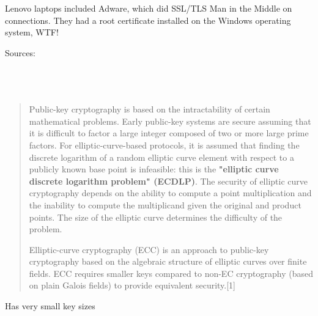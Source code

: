 \documentclass[Screen16to9,17pt]{foils}
\begin{document}


Lenovo laptops included Adware, which did SSL/TLS Man in the Middle on connections.
They had a root certificate installed on the Windows operating system, WTF!

{\footnotesize Sources:\\
\\
\\
\\
}{\tiny{}
}




\begin{quote}
  Public-key cryptography is based on the intractability of certain mathematical problems. Early public-key systems are secure assuming that it is difficult to factor a large integer composed of two or more large prime factors. For elliptic-curve-based protocols, it is assumed that finding the discrete logarithm of a random elliptic curve element with respect to a publicly known base point is infeasible: this is the {\bf "elliptic curve discrete logarithm problem" (ECDLP)}. The security of elliptic curve cryptography depends on the ability to compute a point multiplication and the inability to compute the multiplicand given the original and product points. The size of the elliptic curve determines the difficulty of the problem.

Elliptic-curve cryptography (ECC) is an approach to public-key cryptography based on the algebraic structure of elliptic curves over finite fields. ECC requires smaller keys compared to non-EC cryptography (based on plain Galois fields) to provide equivalent security.[1]
\end{quote}

\begin{list2}
\item {}
\item Has very small key sizes
\end{list2}




\end{document}
